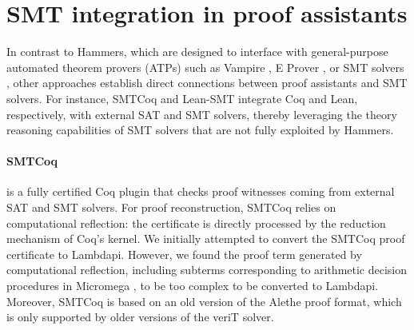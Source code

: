 \section{SMT integration in proof assistants}

In contrast to Hammers, which are designed to interface with general-purpose automated theorem provers (ATPs) such as Vampire \cite{vampire}, E Prover \cite{eprover}, or SMT solvers \cite{z3}, other approaches establish direct connections between proof assistants and SMT solvers.  
For instance, SMTCoq \cite{smtcoq} and Lean-SMT \cite{lean-smt} integrate Coq and Lean, respectively, with external SAT and SMT solvers, thereby leveraging the theory reasoning capabilities of SMT solvers that are not fully exploited by Hammers.

\paragraph{SMTCoq} is a fully certified Coq plugin that checks proof witnesses coming from external SAT and SMT solvers. For proof reconstruction, SMTCoq relies on computational reflection: the certificate is directly processed by the reduction mechanism of Coq's kernel.
We initially attempted to convert the SMTCoq proof certificate to Lambdapi. However, we found the proof term generated by computational reflection, including subterms corresponding to arithmetic decision procedures in Micromega \cite{micromega}, to be too complex to be converted to Lambdapi.
%
Moreover, SMTCoq is based on an old version of the Alethe proof format, which is only supported by older versions of the veriT solver.

